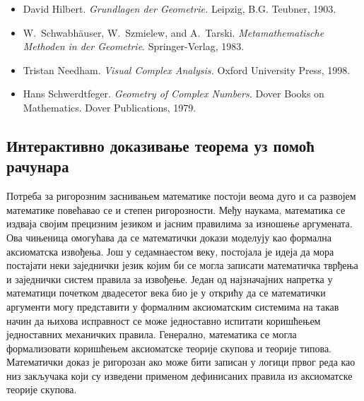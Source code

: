 \documentclass[11pt]{article}
\newcommand{\lat}{}
\begin{document}
\begin{itemize}

\item David Hilbert. {\em Grundlagen der Geometrie.}
 Leipzig, B.G. Teubner, 1903.

\item W.~Schwabhäuser, W.~Szmielew, and A.~Tarski.
{\em Metamathematische Methoden in der Geometrie}.
Springer-Verlag, 1983.

\item {\lat Tristan Needham. {\em Visual Complex Analysis.} Oxford
    University Press, 1998.}

\item {\lat Hans Schwerdtfeger. {\em Geometry of Complex Numbers.}
    Dover Books on Mathematics. Dover Publications, 1979.}
\end{itemize}

\subsection{Интерактивно доказивање теорема уз помоћ рачунара}

Потреба за ригорозним заснивањем математике постоји веома дуго и са
развојем ма\-те\-ма\-ти\-ке повећавао се и степен ригорозности. Међу
наукама, математика се издваја својим прецизним језиком и јасним
правилима за изношење аргумената. Ова чињеница омогућава да се
ма\-те\-ма\-ти\-чки докази моделују као формална аксиоматска
извођења. Још у седамнаестом веку, постојала је идеја да мора
постајати неки заједнички језик којим би се могла записати
ма\-те\-ма\-ти\-чка тврђења и заједнички систем правила за
извођење. Један од најзначајних напретка у математици почетком
двадесетог века био је у открићу да се математички аргументи могу
представити у формалним аксиоматским системима на такав начин да
њихова исправност се може једноставно испитати коришћењем једноставних
механичких правила. Генерално, математика се могла формализовати
коришћењем аксиоматске теорије скупова и теорије
ти\-по\-ва. Математички доказ је ригорозан ако може бити записан у
логици првог реда као низ закључака који су изведени применом
дефинисаних правила из аксиоматске теорије скупова.
\end{document}
